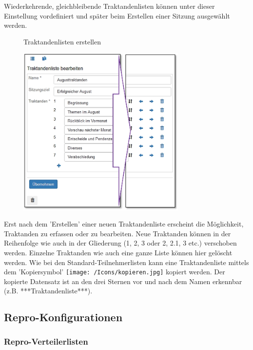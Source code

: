 Wiederkehrende, gleichbleibende Traktandenlisten können unter dieser Einstellung vordefiniert und später beim Erstellen einer Sitzung ausgewählt werden.

\begin{figure}[H]
\caption{Traktandenlisten erstellen}
\end{figure}

\begin{figure}
\vspace{-15pt}
\includegraphics[height=85mm]{../chapters/13_Konfigurationen/pictures/13-10_TraktandenlistenBearbeiten.jpg}
\end{figure}

Erst nach dem 'Erstellen' einer neuen Traktandenliste erscheint die Möglichkeit, Traktanden zu erfassen oder zu bearbeiten. Neue Traktanden können in der Reihenfolge wie auch in der Gliederung (1, 2, 3 oder 2, 2.1, 3 etc.) verschoben werden. Einzelne Traktanden wie auch eine ganze Liste können hier gelöscht werden. Wie bei den Standard-Teilnehmerlisten kann eine Traktandenliste mittels dem 'Kopiersymbol' \texttt{[image: /Icons/kopieren.jpg]} kopiert werden. Der kopierte Datensatz ist an den drei Sternen vor und nach dem Namen erkennbar (z.B. ***Traktandenliste***). 

\subsection{Repro-Konfigurationen}

\subsubsection{Repro-Verteilerlisten}

